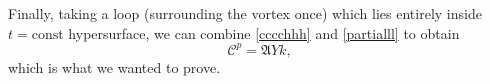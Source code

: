 \documentclass[preprints,article,accept,moreauthors,pdftex]{mdpi}
\begin{document}
Finally, taking a loop (surrounding the vortex once) which lies entirely inside $t=\text{const}$ hypersurface, we can combine \eqref{cccchhh} and \eqref{partialll} to obtain
\begin{equation}
\mathcal{C}^p = \mathfrak{A}Y k,
\end{equation}
which is what we wanted to prove.









\end{document}
